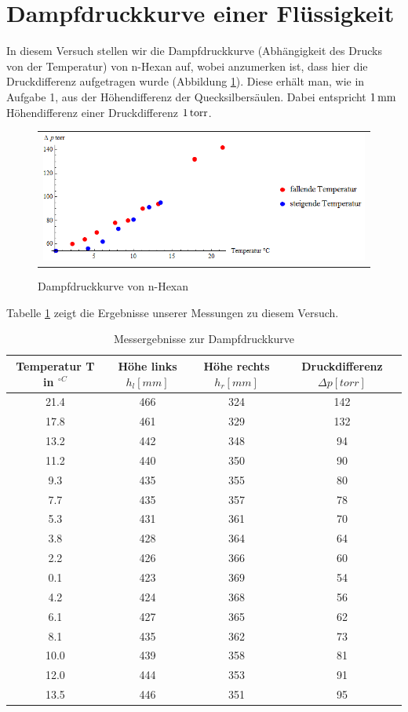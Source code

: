 \documentclass[a4paper,titlepage]{scrartcl}
\numberwithin{equation}{section}
\begin{document}
\section{Dampfdruckkurve einer Flüssigkeit}
In diesem Versuch stellen wir die Dampfdruckkurve (Abhängigkeit des Drucks von der Temperatur) von n-Hexan auf, wobei anzumerken ist, dass hier die Druckdifferenz aufgetragen wurde (Abbildung \ref{fig:aufgabe4}). Diese erhält man, wie in Aufgabe 1, aus der Höhendifferenz der Quecksilbersäulen. Dabei entspricht $\unit[1]{mm}$ Höhendifferenz einer Druckdifferenz $\unit[1]{torr}$.
\begin{figure}[H]
	\centering
	\begin{tabular}{@{}r@{}}
		\includegraphics[width=1\textwidth]{bilder/aufgabe4.png}\\
	\end{tabular}
	\caption{Dampfdruckkurve von n-Hexan}
	\label{fig:aufgabe4}
\end{figure}
Tabelle \ref{tab:aufgabe4} zeigt die Ergebnisse unserer Messungen zu diesem Versuch.
\begin{table}[H]
\begin{tabular}{c|c|c|c}
	Temperatur T in $^{\circ C}$ & Höhe links $h_l [mm]$ & Höhe rechts $h_r [mm]$ & Druckdifferenz $\Delta p [torr]$ \\
	\hline
	21.4 & 466 & 324 & 142 \\
	17.8 & 461 & 329 & 132\\
	13.2 & 442 & 348 & 94 \\
	11.2 & 440 & 350 & 90 \\
	9.3 & 435 & 355 & 80 \\
	7.7 & 435 & 357 & 78 \\
	5.3 & 431 & 361 & 70 \\
	3.8 & 428 & 364 & 64 \\
	2.2 & 426 & 366 & 60 \\
	0.1 & 423 & 369 & 54 \\
	4.2 & 424 & 368 & 56 \\
	6.1 & 427 & 365 & 62 \\
	8.1 & 435 & 362 & 73 \\
	10.0 & 439 & 358 & 81 \\
	12.0 & 444 & 353 & 91 \\
	13.5 & 446 & 351 & 95 \\
\end{tabular}
\caption{Messergebnisse zur Dampfdruckkurve}
\label{tab:aufgabe4}
\end{table}
\end{document}
